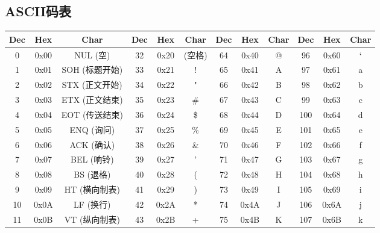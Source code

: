 \documentclass[a4paper, twoside]{article}
\begin{document}
\newpage
\subsection{ASCII码表}
\begin{table}[h]
    \centering
    \renewcommand{\arraystretch}{1.4}
    \setlength{\tabcolsep}{5pt}
    \begin{tabular}{|c c c|c c c|c c c|c c c|}
        \hline
        \textbf{Dec} & \textbf{Hex} & \textbf{Char} & \textbf{Dec} & \textbf{Hex} & \textbf{Char} & \textbf{Dec} & \textbf{Hex} & \textbf{Char} & \textbf{Dec} & \textbf{Hex} & \textbf{Char} \\
        \hline
            0  & 0x00 & NUL (空)          & 32  & 0x20 & (空格)     & 64  & 0x40 & @           &  96  & 0x60 & `            \\
            1  & 0x01 & SOH (标题开始)    & 33  & 0x21 & !          & 65  & 0x41 & A           &  97  & 0x61 & a            \\
            2  & 0x02 & STX (正文开始)    & 34  & 0x22 & "          & 66  & 0x42 & B           &  98  & 0x62 & b            \\
            3  & 0x03 & ETX (正文结束)    & 35  & 0x23 & \#         & 67  & 0x43 & C           &  99  & 0x63 & c            \\
            4  & 0x04 & EOT (传送结束)    & 36  & 0x24 & \$         & 68  & 0x44 & D           & 100  & 0x64 & d            \\
            5  & 0x05 & ENQ (询问)        & 37  & 0x25 & \%         & 69  & 0x45 & E           & 101  & 0x65 & e            \\
            6  & 0x06 & ACK (确认)        & 38  & 0x26 & \&         & 70  & 0x46 & F           & 102  & 0x66 & f            \\
            7  & 0x07 & BEL (响铃)        & 39  & 0x27 & '          & 71  & 0x47 & G           & 103  & 0x67 & g            \\
            8  & 0x08 & BS (退格)         & 40  & 0x28 & (          & 72  & 0x48 & H           & 104  & 0x68 & h            \\
            9  & 0x09 & HT (横向制表)     & 41  & 0x29 & )          & 73  & 0x49 & I           & 105  & 0x69 & i            \\
        10  & 0x0A & LF (换行)         & 42  & 0x2A & *          & 74  & 0x4A & J           & 106  & 0x6A & j            \\
        11  & 0x0B & VT (纵向制表)     & 43  & 0x2B & +          & 75  & 0x4B & K           & 107  & 0x6B & k            \\

\end{tabular}
\end{table}
\end{document}
